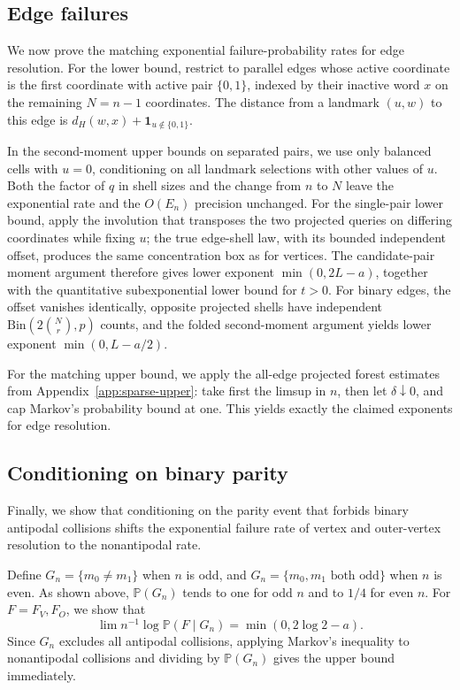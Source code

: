 \subsection{Edge failures}
We now prove the matching exponential failure-probability rates for edge resolution. For the lower bound, restrict to parallel edges whose active coordinate is the first coordinate with active pair $\{0,1\}$, indexed by their inactive word $x$ on the remaining $N=n-1$ coordinates. The distance from a landmark $(u,w)$ to this edge is $d_H(w,x)+\mathbf1_{u\notin\{0,1\}}$.

In the second-moment upper bounds on separated pairs, we use only balanced cells with $u=0$, conditioning on all landmark selections with other values of $u$. Both the factor of $q$ in shell sizes and the change from $n$ to $N$ leave the exponential rate and the $O(E_n)$ precision unchanged. For the single-pair lower bound, apply the involution that transposes the two projected queries on differing coordinates while fixing $u$; the true edge-shell law, with its bounded independent offset, produces the same concentration box as for vertices. The candidate-pair moment argument therefore gives lower exponent $\min(0,2L-a)$, together with the quantitative subexponential lower bound for $t>0$. For binary edges, the offset vanishes identically, opposite projected shells have independent $\mathrm{Bin}(2\binom Nr,p)$ counts, and the folded second-moment argument yields lower exponent $\min(0,L-a/2)$.

For the matching upper bound, we apply the all-edge projected forest estimates from Appendix~\ref{app:sparse-upper}: take first the limsup in $n$, then let $\delta\downarrow0$, and cap Markov's probability bound at one. This yields exactly the claimed exponents for edge resolution.

\subsection{Conditioning on binary parity}
Finally, we show that conditioning on the parity event that forbids binary antipodal collisions shifts the exponential failure rate of vertex and outer-vertex resolution to the nonantipodal rate.

Define $G_n=\{m_0\ne m_1\}$ when $n$ is odd, and $G_n=\{m_0,m_1\text{ both odd}\}$ when $n$ is even. As shown above, $\mathbb P(G_n)$ tends to one for odd $n$ and to $1/4$ for even $n$. For $F=F_V,F_O$, we show that
\[
 \lim n^{-1}\log\mathbb P(F\mid G_n)=\min(0,2\log 2-a).
\]
Since $G_n$ excludes all antipodal collisions, applying Markov's inequality to nonantipodal collisions and dividing by $\mathbb P(G_n)$ gives the upper bound immediately.

